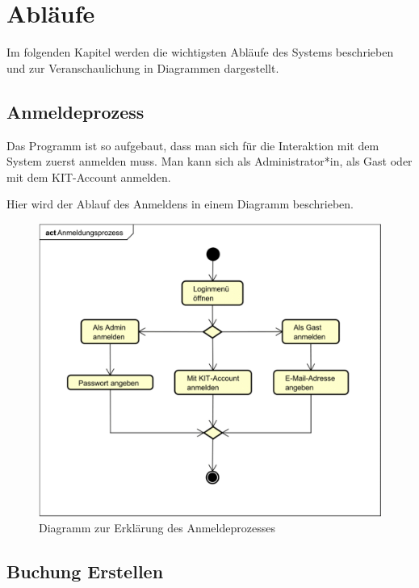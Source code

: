 
\chapter{Abläufe}
\label{ch:processes}

Im folgenden Kapitel werden die wichtigsten Abläufe des Systems beschrieben und zur Veranschaulichung in
Diagrammen dargestellt.

\section{Anmeldeprozess}

Das Programm ist so aufgebaut, dass man sich für die Interaktion mit dem System zuerst anmelden muss.
Man kann sich als Administrator*in, als Gast oder mit dem KIT-Account anmelden.

Hier wird der Ablauf des Anmeldens in einem Diagramm beschrieben.

\begin{figure}[ht]
    \centering
    \includegraphics[width=\textwidth]{figures/activity/anmeldeprozess}
    \caption{Diagramm zur Erklärung des Anmeldeprozesses}
    \label{fig:login-diagram}
\end{figure}
\clearpage

\section{Buchung Erstellen}

